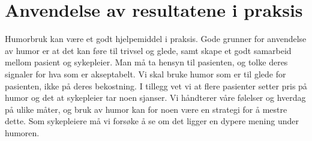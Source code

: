 \chapter{Anvendelse av resultatene i praksis}

Humorbruk kan være et godt hjelpemiddel i praksis. Gode grunner for anvendelse
av humor er at det kan føre til trivsel og glede, samt skape et godt samarbeid
mellom pasient og sykepleier. Man må ta hensyn til pasienten, og tolke deres
signaler for hva som er akseptabelt. Vi skal bruke humor som er til glede for
pasienten, ikke på deres bekostning. I tillegg vet vi at flere pasienter setter
pris på humor og det at sykepleier tar noen sjanser. Vi håndterer våre følelser
og hverdag på ulike måter, og bruk av humor kan for noen være en strategi for å
mestre dette. Som sykepleiere må vi forsøke å se om det ligger en dypere mening
under humoren.
